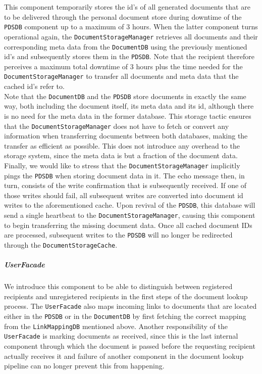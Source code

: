 \documentclass[a4paper,10pt]{article}
\begin{document}
This component temporarily stores the id's of all generated documents that are to be delivered through the personal document store during downtime of the \texttt{PDSDB} component up to a maximum of 3 hours. When the latter component turns operational again, the \texttt{DocumentStorageManager} retrieves all documents and their corresponding meta data from the \texttt{DocumentDB} using the previously mentioned id's and subsequently stores them in the \texttt{PDSDB}. Note that the recipient therefore perceives a maximum total downtime of 3 hours plus the time needed for the \texttt{DocumentStorageManager} to transfer all documents and meta data that the cached id's refer to. \\
Note that the \texttt{DocumentDB} and the \texttt{PDSDB} store documents in exactly the same way, both including the document itself, its meta data and its id, although there is no need for the meta data in the former database. This storage tactic ensures that the \texttt{DocumentStorageManager} does not have to fetch or convert any information when transferring documents between both databases, making the transfer as efficient as possible. This does not introduce any overhead to the storage system, since the meta data is but a fraction of the document data. \\
Finally, we would like to stress that the \texttt{DocumentStorageManager} implicitly pings the \texttt{PDSDB} when storing document data in it. The echo message then, in turn, consists of the write confirmation that is subsequently received. If one of those writes should fail, all subsequent writes are converted into document id writes to the aforementioned cache. Upon revival of the \texttt{PDSDB}, this database will send a single heartbeat to the \texttt{DocumentStorageManager}, causing this component to begin transferring the missing document data. Once all cached document IDs are processed, subsequent writes to the \texttt{PDSDB} will no longer be redirected through the \texttt{DocumentStorageCache}.

\subparagraph{UserFacade}
We introduce this component to be able to distinguish between registered recipients and unregistered recipients in the first steps of the document lookup process. The \texttt{UserFacade} also maps incoming links to documents that are located either in the \texttt{PDSDB} or in the \texttt{DocumentDB} by first fetching the correct mapping from the \texttt{LinkMappingDB} mentioned above. Another responsibility of the \texttt{UserFacade} is marking documents as received, since this is the last internal component through which the document is passed before the requesting recipient actually receives it and failure of another component in the document lookup pipeline can no longer prevent this from happening.
\end{document}
